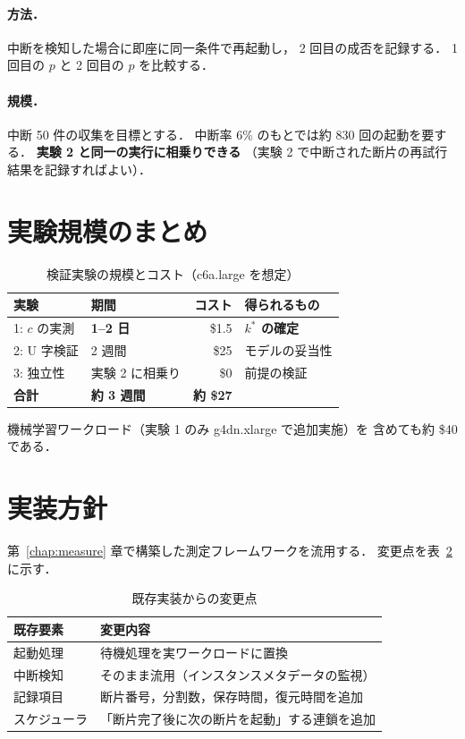 \documentclass[11pt,a4paper]{ltjsreport}
\begin{document}
\paragraph{方法．}
中断を検知した場合に即座に同一条件で再起動し，
2 回目の成否を記録する．
1 回目の $p$ と 2 回目の $p$ を比較する．

\paragraph{規模．}
中断 50 件の収集を目標とする．
中断率 6\% のもとでは約 830 回の起動を要する．
\textbf{実験 2 と同一の実行に相乗りできる}
（実験 2 で中断された断片の再試行結果を記録すればよい）．

\section{実験規模のまとめ}

\begin{table}[htbp]
\centering
\caption{検証実験の規模とコスト（c6a.large を想定）}
\label{tab:exp_scale}
\small
\begin{tabularx}{\textwidth}{@{}llrX@{}}
\toprule
実験 & 期間 & コスト & 得られるもの \\
\midrule
1: $c$ の実測   & \textbf{1--2 日} & \$1.5 & \textbf{$k^{*}$ の確定} \\
2: U 字検証     & 2 週間 & \$25 & モデルの妥当性 \\
3: 独立性       & 実験 2 に相乗り & \$0 & 前提の検証 \\
\midrule
\textbf{合計}   & \textbf{約 3 週間} & \textbf{約 \$27} & \\
\bottomrule
\end{tabularx}
\end{table}

機械学習ワークロード（実験 1 のみ g4dn.xlarge で追加実施）を
含めても約 \$40 である．

\section{実装方針}

第~\ref{chap:measure} 章で構築した測定フレームワークを流用する．
変更点を表~\ref{tab:impl} に示す．

\begin{table}[htbp]
\centering
\caption{既存実装からの変更点}
\label{tab:impl}
\small
\begin{tabularx}{\textwidth}{@{}lX@{}}
\toprule
既存要素 & 変更内容 \\
\midrule
起動処理 & 待機処理を実ワークロードに置換 \\
中断検知 & そのまま流用（インスタンスメタデータの監視） \\
記録項目 & 断片番号，分割数，保存時間，復元時間を追加 \\
スケジューラ & 「断片完了後に次の断片を起動」する連鎖を追加 \\
\bottomrule
\end{tabularx}
\end{table}
\end{document}
